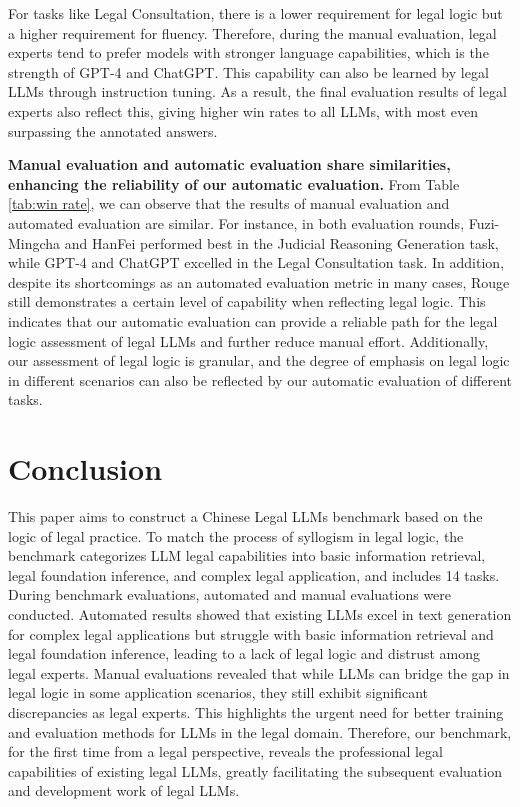 For tasks like Legal Consultation, there is a lower requirement for legal logic but a higher requirement for fluency. 
Therefore, during the manual evaluation, legal experts tend to prefer models with stronger language capabilities, which is the strength of GPT-4 and ChatGPT. This capability can also be learned by legal LLMs through instruction tuning. 
As a result, the final evaluation results of legal experts also reflect this, giving higher win rates to all LLMs, with most even surpassing the annotated answers.

\textbf{Manual evaluation and automatic evaluation share similarities, enhancing the reliability of our automatic evaluation.}
From Table \ref{tab:win rate}, we can observe that the results of manual evaluation and automated evaluation are similar. 
For instance, in both evaluation rounds, Fuzi-Mingcha and HanFei performed best in the Judicial Reasoning Generation task, while GPT-4 and ChatGPT excelled in the Legal Consultation task. 
In addition, despite its shortcomings as an automated evaluation metric in many cases, Rouge still demonstrates a certain level of capability when reflecting legal logic.
This indicates that our automatic evaluation can provide a reliable path for the legal logic assessment of legal LLMs and further reduce manual effort. 
Additionally, our assessment of legal logic is granular, and the degree of emphasis on legal logic in different scenarios can also be reflected by our automatic evaluation of different tasks.

\section{Conclusion}
This paper aims to construct a Chinese Legal LLMs benchmark based on the logic of legal practice. To match the process of syllogism in legal logic, the benchmark categorizes LLM legal capabilities into basic information retrieval, legal foundation inference, and complex legal application, and includes 14 tasks. During benchmark evaluations, automated and manual evaluations were conducted. Automated results showed that existing LLMs excel in text generation for complex legal applications but struggle with basic information retrieval and legal foundation inference, leading to a lack of legal logic and distrust among legal experts. Manual evaluations revealed that while LLMs can bridge the gap in legal logic in some application scenarios, they still exhibit significant discrepancies as legal experts. This highlights the urgent need for better training and evaluation methods for LLMs in the legal domain. Therefore, our benchmark, for the first time from a legal perspective, reveals the professional legal capabilities of existing legal LLMs, greatly facilitating the subsequent evaluation and development work of legal LLMs. 

